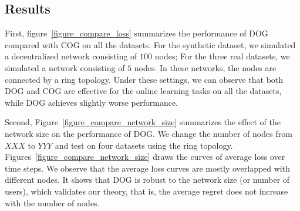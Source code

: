 \documentclass{article}
\begin{document}
\subsection{Results}

First, figure~\ref{figure_compare_loss} summarizes the performance of DOG compared with COG on all the datasets. 
For the synthetic dataset, we simulated a decentralized network consisting of $100$ nodes; 
For the three real datasets, we simulated a network consisting of $5$ nodes. 
In these networks, the nodes are connected by a ring topology. 
Under these settings, we can observe that both DOG and COG are effective for the online learning tasks on all the datasets, while DOG achieves slightly worse performance. 


{\color{red}
Second, Figure~\ref{figure_compare_network_size} summarizes the effect of the network size on the performance of DOG. We change the number of nodes from $XXX$ to $YYY$ and test on four datasets using the ring topology. Figures~\ref{figure_compare_network_size} draws the curves of average loss over time steps. We observe that the average loss curves are mostly overlapped with different nodes. It shows that DOG is robust to the network size (or number of users), which validates our theory, that is, the average regret does not increase with the number of nodes. 
}
\end{document}
